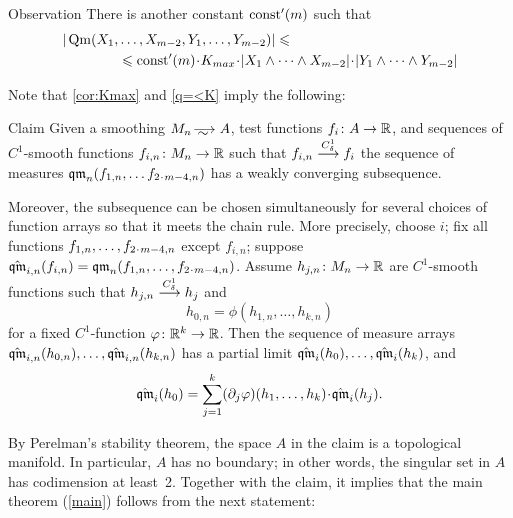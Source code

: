 \begin{thm}{Observation}\label{q=<K}
There is another constant $\mathrm{const}'(m)$ such that 
\begin{align*}
|\Qm(X_1,&\dots,X_{m-2},Y_1,\dots,Y_{m-2})|\le
\\
&\le 
\const'(m)\cdot K_{max}\cdot|X_1\wedge\dots\wedge X_{m-2}|\cdot |Y_1\wedge\dots\wedge Y_{m-2}|
\end{align*}

\end{thm}

Note that \ref{cor:Kmax} and \ref{q=<K} imply the following:

\begin{thm}{Claim}\label{clm:weak-partial-limit}
Given a smoothing $M_n\smooths{} A$,
test functions $f_i\:A\zz\to \RR$,
and sequences of $C^1$-smooth functions $f_{i,n}\colon M_n\to \mathbb{R}$ such that 
$f_{i,n}\zz\smoothto f_i$ the sequence of measures 
$\qm_n(f_{1,n},\zz\dots f_{2\cdot m-4,n})$ has a weakly converging subsequence.

Moreover, the subsequence can be chosen simultaneously for several choices of function arrays so that it meets the chain rule.
More precisely, choose $i$; fix all functions $f_{1,n},\zz\dots, f_{2\cdot m-4,n}$ except $f_{i,n}$;
suppose $\hat\qm_{i,n}(f_{i,n})=\qm_n(f_{1,n},\zz\dots, f_{2\cdot m-4,n})$.
Assume $h_{j,n}\colon M_n\to \mathbb{R}$ are $C^1$-smooth functions such that 
$h_{j,n}\zz\smoothto h_j$ and 
\[h_{0,n}=\phi(h_{1,n},\dots,h_{k,n})\]
for a fixed $C^1$-function $\varphi\colon\mathbb{R}^k\to\mathbb{R}$.
Then the sequence of measure arrays $\hat\qm_{i,n}(h_{0,n}),\zz\dots,\hat\qm_{i,n}(h_{k,n})$
has a partial limit $\hat\qm_{i}(h_0),\zz\dots,\hat\qm_{i}(h_k)$, and
\[\hat\qm_{i}(h_0)=\sum_{j=1}^k (\partial_j\phi)(h_1,\dots,h_k)\cdot\hat\qm_{i}(h_j).\]

\end{thm}


By Perelman's stability theorem, the space $A$ in the claim is a topological manifold.
In particular, $A$ has no boundary;
in other words, the singular set in $A$ has codimension at least~2.
Together with the claim, it implies that the main theorem (\ref{main}) follows from the next statement:

